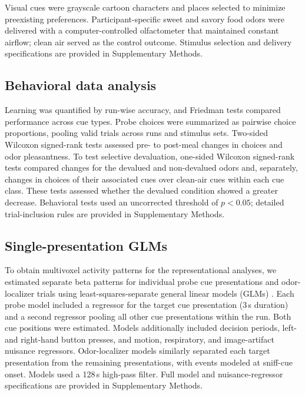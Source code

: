 \documentclass[9pt,twocolumn,twoside]{pnas-new}
\begin{document}
{Visual cues were grayscale cartoon characters and places selected to minimize preexisting preferences. Participant-specific sweet and savory food odors were delivered with a computer-controlled olfactometer that maintained constant airflow; clean air served as the control outcome. Stimulus selection and delivery specifications are provided in Supplementary Methods.

\subsection*{Behavioral data analysis}

Learning was quantified by run-wise accuracy, and Friedman tests compared performance across cue types. Probe choices were summarized as pairwise choice proportions, pooling valid trials across runs and stimulus sets. Two-sided Wilcoxon signed-rank tests assessed pre- to post-meal changes in choices and odor pleasantness. To test selective devaluation, one-sided Wilcoxon signed-rank tests compared changes for the devalued and non-devalued odors and, separately, changes in choices of their associated cues over clean-air cues within each cue class. These tests assessed whether the devalued condition showed a greater decrease. Behavioral tests used an uncorrected threshold of $p < 0.05$; detailed trial-inclusion rules are provided in Supplementary Methods.

\subsection*{Single-presentation GLMs}

To obtain multivoxel activity patterns for the representational analyses, we estimated separate beta patterns for individual probe cue presentations and odor-localizer trials using least-squares-separate general linear models (GLMs) \cite{mumford2012deconvolving}. Each probe model included a regressor for the target cue presentation (3\,s duration) and a second regressor pooling all other cue presentations within the run. Both cue positions were estimated. Models additionally included decision periods, left- and right-hand button presses, and motion, respiratory, and image-artifact nuisance regressors. Odor-localizer models similarly separated each target presentation from the remaining presentations, with events modeled at sniff-cue onset. Models used a 128\,s high-pass filter. Full model and nuisance-regressor specifications are provided in Supplementary Methods.

}
\end{document}
